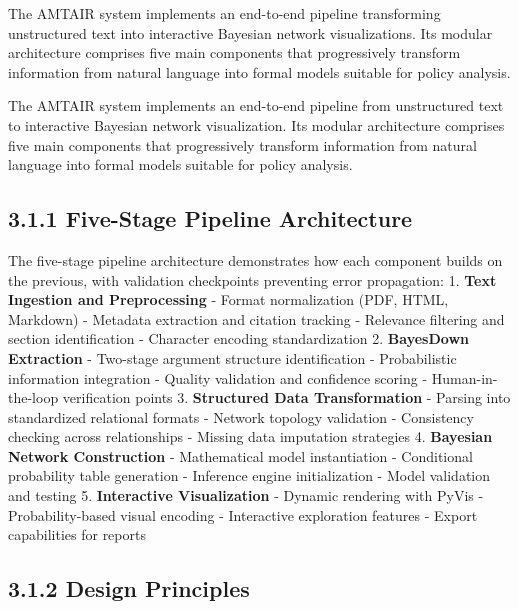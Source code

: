 \documentclass[
  11pt,
  letterpaper,
]{book}
\begin{document}

The AMTAIR system implements an end-to-end pipeline transforming
unstructured text into interactive Bayesian network visualizations. Its
modular architecture comprises five main components that progressively
transform information from natural language into formal models suitable
for policy analysis.

The AMTAIR system implements an end-to-end pipeline from unstructured
text to interactive Bayesian network visualization. Its modular
architecture comprises five main components that progressively transform
information from natural language into formal models suitable for policy
analysis.

\subsection*{3.1.1 Five-Stage Pipeline
Architecture}\label{sec-five-stage-pipeline}

The five-stage pipeline architecture demonstrates how each component
builds on the previous, with validation checkpoints preventing error
propagation: 1. \textbf{Text Ingestion and Preprocessing} - Format
normalization (PDF, HTML, Markdown) - Metadata extraction and citation
tracking - Relevance filtering and section identification - Character
encoding standardization 2. \textbf{BayesDown Extraction} - Two-stage
argument structure identification - Probabilistic information
integration - Quality validation and confidence scoring -
Human-in-the-loop verification points 3. \textbf{Structured Data
Transformation} - Parsing into standardized relational formats - Network
topology validation - Consistency checking across relationships -
Missing data imputation strategies 4. \textbf{Bayesian Network
Construction} - Mathematical model instantiation - Conditional
probability table generation - Inference engine initialization - Model
validation and testing 5. \textbf{Interactive Visualization} - Dynamic
rendering with PyVis - Probability-based visual encoding - Interactive
exploration features - Export capabilities for reports

\subsection*{3.1.2 Design Principles}\label{sec-design-principles}
\end{document}
